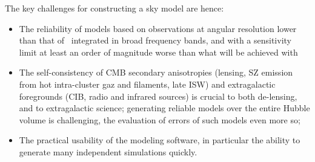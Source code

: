 The key challenges for constructing a sky model are hence:
\begin{itemize} 
\item The reliability of models based on observations at angular resolution lower than that of \cmbexp\, integrated in broad frequency bands, and with a sensitivity limit at least an order of magnitude worse than what will be achieved with \cmbexp\;%
\item The self-consistency of CMB secondary anisotropies (lensing, SZ emission from hot intra-cluster gaz and filaments, late ISW) and extragalactic foregrounds (CIB, radio and infrared sources) is crucial to both de-lensing, and to extragalactic science; generating reliable models over the entire Hubble volume is challenging, the evaluation of errors of such models even more so;
\item The practical usability of the modeling software, in particular the ability to generate many independent simulations quickly.
\end{itemize} 


%


